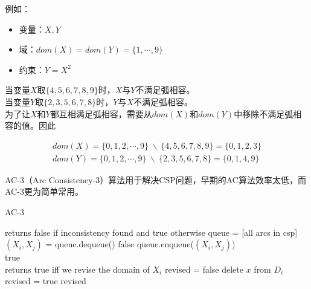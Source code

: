 例如：

\begin{itemize}
    \item 变量：$ X, Y $
    \item 域：$ dom(X) = dom(Y) = \{1, \cdots, 9\} $
    \item 约束：$ Y = X^2 $
\end{itemize}

当变量$ X $取$ \{4, 5, 6, 7, 8, 9\} $时，$ X $与$ Y $不满足弧相容。\\

当变量$ Y $取$ \{2, 3, 5, 6, 7, 8\} $时，$ Y $与$ X $不满足弧相容。\\

为了让$ X $和$ Y $都互相满足弧相容，需要从$ dom(X) $和$ dom(Y) $中移除不满足弧相容的值。因此

\vspace{-1cm}

\begin{align*}
    dom(X) = \{0, 1, 2, \cdots, 9\}\ \backslash \ \{4, 5, 6, 7, 8, 9\} = \{0, 1, 2, 3\} \\
    dom(Y) = \{0, 1, 2, \cdots, 9\}\ \backslash \ \{2, 3, 5, 6, 7, 8\} = \{0, 1, 4, 9\}
\end{align*}

AC-3（Arc Consistency-3）算法用于解决CSP问题，早期的AC算法效率太低，而AC-3更为简单常用。\\

\begin{algorithm}[H]
    \caption{AC-3}
    \begin{algorithmic}[1]
         returns false if inconsistency found and true otherwise
        \State queue = [all arcs in csp]
        \\
        \State $ (X_i, X_j) $ = queue.dequeue()
        \State \Return false
        \EndIf
        \State queue.enqueue($ (X_i, X_j) $)
        \EndFor
        \EndIf
        \EndWhile
        \\
        \State \Return true
        \EndProcedure
        \\
         returns true iff we revise the domain of $ X_i $
        \State revised = false
        \State delete $ x $ from $ D_i $
        \State revised = true
        \EndIf
        \EndFor
        \State \Return revised
        \EndProcedure
    \end{algorithmic}
\end{algorithm}

